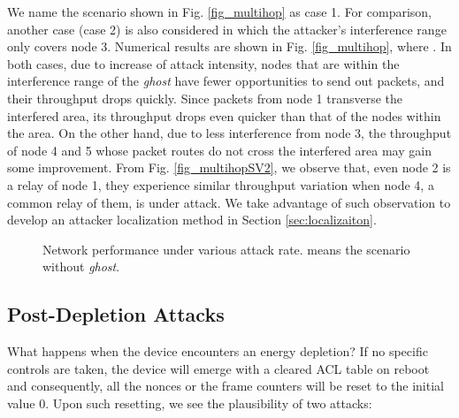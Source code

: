 \documentclass[10pt,journal,cspaper,compsoc]{IEEEtran}
\begin{document}
We name the scenario shown in Fig. \ref{fig_multihop} as case 1. For comparison, another case (case 2) is also considered in which the attacker's interference range only covers node 3. Numerical results are shown in Fig. \ref{fig_multihop}, where . In both cases, due to increase of attack intensity, nodes that are within the interference range of the {\em ghost} have fewer opportunities to send out packets, and their throughput drops quickly. Since packets from node 1 transverse the interfered area, its throughput drops even quicker than that of the nodes within the area. On the other hand, due to less interference from node 3, the throughput of node 4 and 5 whose packet routes do not cross the interfered area may gain some improvement. From Fig. \ref{fig_multihopSV2}, we observe that, even node 2 is a relay of node 1, they experience similar throughput variation when node 4, a common relay of them, is under attack. We take advantage of such observation to develop an attacker localization method in Section \ref{sec:localizaiton}.
\begin{figure}[htbp]
\centering
\caption{Network performance under various attack rate.  means the scenario without {\em ghost}.}	
	\label{Fig_multihop}
    \vspace{-3mm}
\end{figure}

\subsection{Post-Depletion Attacks}
What happens when the device encounters an energy depletion? If no specific controls are taken, the device will emerge with a cleared ACL table on reboot and consequently, all the nonces or the frame counters will be reset to the initial value 0. Upon such resetting, we see the plausibility of two attacks:
\end{document}
